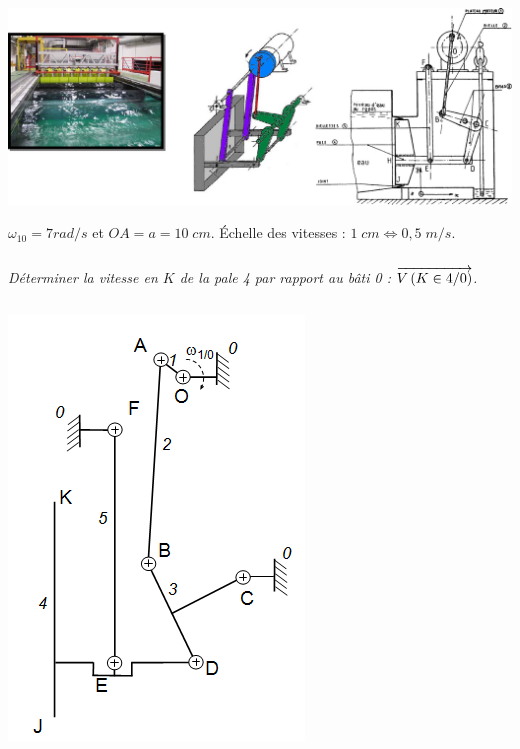 \documentclass[10pt,fleqn]{article} %
\begin{document}
\begin{center}
\includegraphics[width=.8\textwidth]{images/houle_01}
\end{center}
\begin{minipage}[c]{.45\linewidth}
\end{minipage}\hfill
\begin{minipage}[c]{.45\linewidth}
\end{minipage}

$\omega_{10} = 7 rad/s$ et $OA =a= 10\; cm$. Échelle des vitesses : $1\; cm \Longleftrightarrow 0,5\; m/s$.
\subparagraph{}
\textit{Déterminer la vitesse en $K$ de la pale 4 par rapport au bâti 0 : $\overrightarrow{V\left( {K} \in {4}/{0}\right)}$.}

\newpage
$$
\quad
$$

\begin{center}
\includegraphics[width=.7\textwidth]{images/houle_02}
\end{center}
\end{document}
